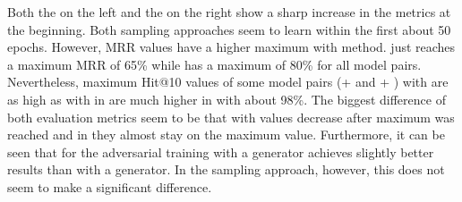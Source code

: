 Both the \usmax  on the left and the \ussoftmax on the right show a sharp increase in the metrics at the beginning.
Both sampling approaches seem to learn within the first about 50 epochs.
However, MRR values have a higher maximum with \ussoftmax method.
\usmax just reaches a maximum MRR of 65\% while \ussoftmax has a maximum of 80\% for all model pairs.
Nevertheless, maximum Hit@10 values of some model pairs (\distmult + \transd and \complex + \transe) with \usmax are as high as with \ussoftmax in are much higher in \ussoftmax with about 98\%.
The biggest difference of both evaluation metrics seem to be that with \usmax values decrease after maximum was reached and in \ussoftmax they almost stay on the maximum value.
Furthermore, it can be seen that for \usmax the adversarial training with a \distmult generator achieves slightly better results than with a \complex generator.
In the \ussoftmax sampling approach, however, this does not seem to make a significant difference. 

